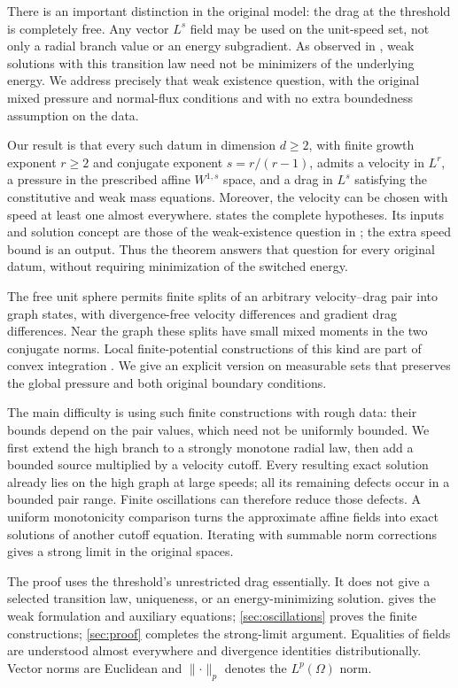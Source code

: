 \documentclass[11pt]{article}
\theoremstyle{remark}
\newcommand{\norm}[2]{\lVert #1\rVert_{#2}}
\begin{document}
There is an important distinction in the original model: the drag at the
threshold is completely free. Any vector $L^s$ field may be used on the
unit-speed set, not only a radial branch value or an energy subgradient.
As observed in \cite[Remark 3.6]{FP22}, weak solutions with this transition
law need not be minimizers of the underlying energy. We address precisely
that weak existence question, with the original mixed pressure and normal-flux
conditions and with no extra boundedness assumption on the data.

Our result is that every such datum in dimension $d\ge2$, with finite
growth exponent $r\ge2$ and conjugate exponent $s=r/(r-1)$, admits a
velocity in $L^r$, a pressure in the prescribed affine $W^{1,s}$ space,
and a drag in $L^s$ satisfying the constitutive and weak mass equations.
Moreover, the velocity can be chosen with speed at least one almost everywhere.
 states the complete hypotheses. Its inputs and solution
concept are those of the weak-existence question in \cite{AIM527}; the extra
speed bound is an output. Thus the theorem answers that question for every
original datum, without requiring minimization of the switched energy.

The free unit sphere permits finite splits of an arbitrary velocity--drag
pair into graph states, with divergence-free velocity differences and gradient
drag differences. Near the graph these splits have small mixed moments in
the two conjugate norms. Local finite-potential constructions of this kind
are part of convex integration \cite{ST21}. We give an explicit version
on measurable sets that preserves the global pressure and both original
boundary conditions.

The main difficulty is using such finite constructions with rough data:
their bounds depend on the pair values, which need not be uniformly bounded.
We first extend the high branch to a strongly monotone radial law, then add
a bounded source multiplied by a velocity cutoff. Every resulting exact
solution already lies on the high graph at large speeds; all its remaining
defects occur in a bounded pair range. Finite oscillations can therefore
reduce those defects. A uniform monotonicity comparison turns the approximate
affine fields into exact solutions of another cutoff equation. Iterating
with summable norm corrections gives a strong limit in the original spaces.

The proof uses the threshold's unrestricted drag essentially. It does not
give a selected transition law, uniqueness, or an energy-minimizing solution.
 gives the weak formulation and auxiliary equations;
\cref{sec:oscillations} proves the finite constructions;
\cref{sec:proof} completes the strong-limit argument. Equalities of fields
are understood almost everywhere and divergence identities distributionally.
Vector norms are Euclidean and $\norm{\cdot}{p}$ denotes the $L^p(\Omega)$ norm.
\end{document}

